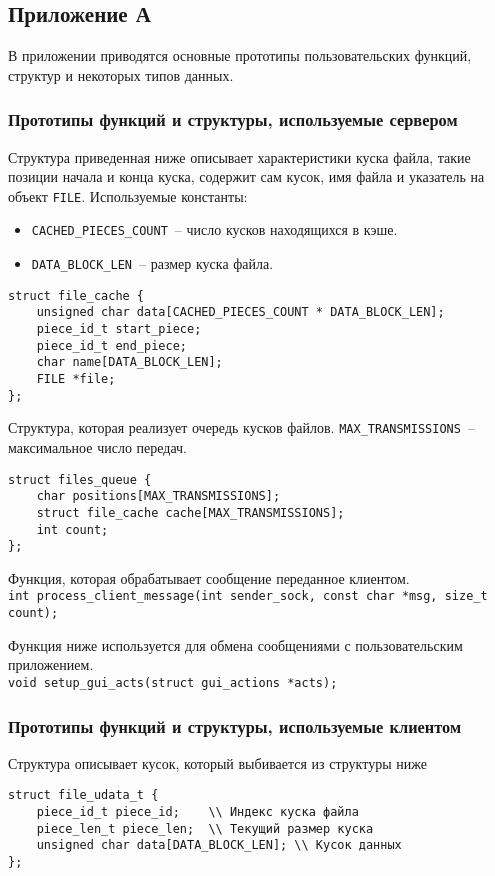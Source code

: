 \begin{appendix}
\section*{Приложение А}
В приложении приводятся основные прототипы пользовательских функций,
структур и некоторых типов данных.
\subsubsection*{Прототипы функций и структуры, используемые сервером}
Структура приведенная ниже описывает характеристики куска файла, такие
позиции начала и конца куска, содержит сам кусок, имя файла и указатель
на объект \texttt{FILE}. Используемые константы:
\begin{itemize}
    \item \texttt{CACHED\_PIECES\_COUNT}~-- число кусков находящихся в кэше.
    \item \texttt{DATA\_BLOCK\_LEN}~-- размер куска файла.
\end{itemize}
\begin{lstlisting}
struct file_cache {
    unsigned char data[CACHED_PIECES_COUNT * DATA_BLOCK_LEN];
    piece_id_t start_piece;
    piece_id_t end_piece;
    char name[DATA_BLOCK_LEN];
    FILE *file;
};
\end{lstlisting}

Структура, которая реализует очередь кусков файлов.
\texttt{MAX\_TRANSMISSIONS}~-- максимальное число передач.
\begin{lstlisting}
struct files_queue {
    char positions[MAX_TRANSMISSIONS];
    struct file_cache cache[MAX_TRANSMISSIONS];
    int count;
};
\end{lstlisting}

Функция, которая обрабатывает сообщение переданное клиентом.\\
\texttt{int process\_client\_message(int sender\_sock, const char *msg, size\_t count);}

Функция ниже используется для обмена сообщениями с пользовательским
приложением.\\
\texttt{void setup\_gui\_acts(struct gui\_actions *acts);}

\subsubsection*{Прототипы функций и структуры, используемые клиентом}
Структура описывает кусок, который выбивается из структуры ниже
\begin{lstlisting}
struct file_udata_t {
    piece_id_t piece_id;    \\ Индекс куска файла
    piece_len_t piece_len;  \\ Текущий размер куска
    unsigned char data[DATA_BLOCK_LEN]; \\ Кусок данных
};
\end{lstlisting}


\end{appendix}
